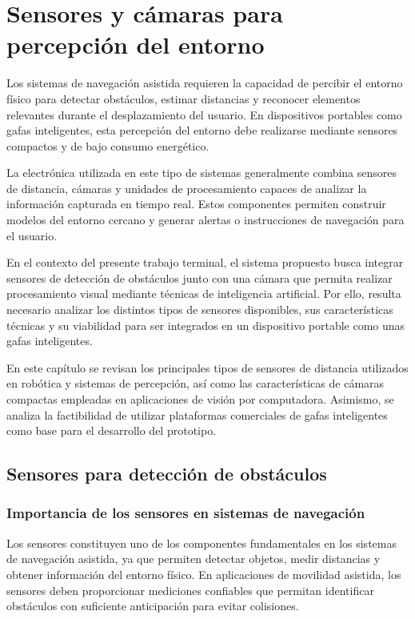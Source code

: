 \section{Sensores y cámaras para percepción del entorno}

Los sistemas de navegación asistida requieren la capacidad de percibir el entorno físico para detectar obstáculos, estimar distancias y reconocer elementos relevantes durante el desplazamiento del usuario. En dispositivos portables como gafas inteligentes, esta percepción del entorno debe realizarse mediante sensores compactos y de bajo consumo energético.

La electrónica utilizada en este tipo de sistemas generalmente combina sensores de distancia, cámaras y unidades de procesamiento capaces de analizar la información capturada en tiempo real. Estos componentes permiten construir modelos del entorno cercano y generar alertas o instrucciones de navegación para el usuario.

En el contexto del presente trabajo terminal, el sistema propuesto busca integrar sensores de detección de obstáculos junto con una cámara que permita realizar procesamiento visual mediante técnicas de inteligencia artificial. Por ello, resulta necesario analizar los distintos tipos de sensores disponibles, sus características técnicas y su viabilidad para ser integrados en un dispositivo portable como unas gafas inteligentes.

En este capítulo se revisan los principales tipos de sensores de distancia utilizados en robótica y sistemas de percepción, así como las características de cámaras compactas empleadas en aplicaciones de visión por computadora. Asimismo, se analiza la factibilidad de utilizar plataformas comerciales de gafas inteligentes como base para el desarrollo del prototipo.

\subsection{Sensores para detección de obstáculos}

\subsubsection{Importancia de los sensores en sistemas de navegación}

Los sensores constituyen uno de los componentes fundamentales en los sistemas de navegación asistida, ya que permiten detectar objetos, medir distancias y obtener información del entorno físico. En aplicaciones de movilidad asistida, los sensores deben proporcionar mediciones confiables que permitan identificar obstáculos con suficiente anticipación para evitar colisiones.

